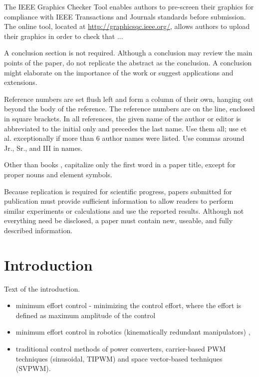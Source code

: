 \documentclass[journal]{IEEEtranTIE}
\begin{document}
The IEEE Graphics Checker Tool enables authors to pre-screen their graphics for compliance with IEEE Transactions and Journals standards before submission. The online tool, located at \url{http://graphicsqc.ieee.org/}, allows authors to upload their graphics in order to check that ... 

A conclusion section is not required. Although a conclusion may review the main points of the paper, do not replicate the abstract as the conclusion. A conclusion might elaborate on the importance of the work or suggest applications and extensions.

Reference numbers are set flush left and form a column of their own, hanging out beyond the body of the reference. The reference numbers are on the line, enclosed in square brackets. In all references, the given name of the author or editor is abbreviated to the initial only and precedes the last name. Use them all; use et al. exceptionally if more than 6 author names were listed. Use commas around Jr., Sr., and III in names. 

Other than books \cite{inbook1, book1, book2, book3}, capitalize only the first word in a paper title, except for proper nouns and element symbols. 

Because replication is required for scientific progress, papers submitted for publication must provide sufficient information to allow readers to perform similar experiments or calculations and use the reported results. Although not everything need be disclosed, a paper must contain new, useable, and fully described information.

\newpage





\section{Introduction}

Text of the introduction.
\begin{itemize}
\item minimum effort control - minimizing the control effort, where the
effort is defined as maximum amplitude of the control \cite{neustadt1962minimum,porter1966note,Tomlin1975}
\item minimum effort control in robotics (kinematically redundant manipulators)
\cite{ajoudani2013human,lee2001structured,Shim1998,Lee&Ha2001}, 
\item traditional control methods of power converters, carrier-based PWM
techniques (sinusoidal, TIPWM) and space vector-based techniques (SVPWM).
\end{itemize}
\end{document}
